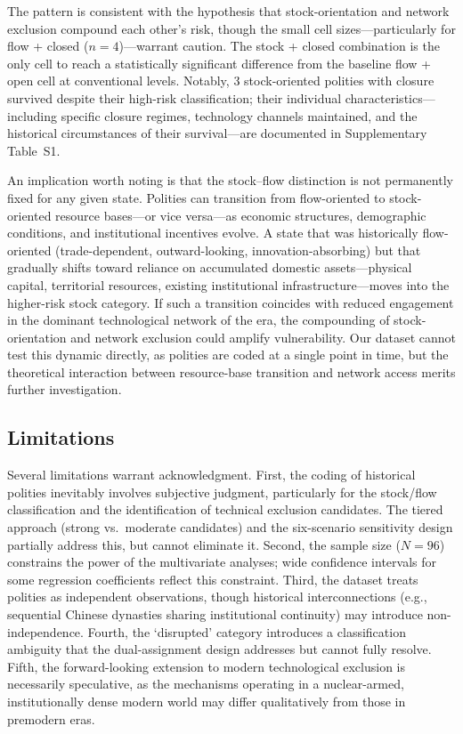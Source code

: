\documentclass[pdflatex,sn-basic]{sn-jnl}
\theoremstyle{thmstyleone}%
\theoremstyle{thmstyletwo}%
\theoremstyle{thmstylethree}%
\begin{document}
The pattern is consistent with the hypothesis that stock-orientation and network exclusion compound each other's risk, though the small cell sizes---particularly for flow + closed ($n = 4$)---warrant caution. The stock + closed combination is the only cell to reach a statistically significant difference from the baseline flow + open cell at conventional levels. Notably, 3 stock-oriented polities with closure survived despite their high-risk classification; their individual characteristics---including specific closure regimes, technology channels maintained, and the historical circumstances of their survival---are documented in Supplementary Table~S1.

An implication worth noting is that the stock--flow distinction is not permanently fixed for any given state. Polities can transition from flow-oriented to stock-oriented resource bases---or vice versa---as economic structures, demographic conditions, and institutional incentives evolve. A state that was historically flow-oriented (trade-dependent, outward-looking, innovation-absorbing) but that gradually shifts toward reliance on accumulated domestic assets---physical capital, territorial resources, existing institutional infrastructure---moves into the higher-risk stock category. If such a transition coincides with reduced engagement in the dominant technological network of the era, the compounding of stock-orientation and network exclusion could amplify vulnerability. Our dataset cannot test this dynamic directly, as polities are coded at a single point in time, but the theoretical interaction between resource-base transition and network access merits further investigation.

\subsection{Limitations}\label{sec:disc-limitations}

Several limitations warrant acknowledgment. First, the coding of historical polities inevitably involves subjective judgment, particularly for the stock/flow classification and the identification of technical exclusion candidates. The tiered approach (strong vs.\ moderate candidates) and the six-scenario sensitivity design partially address this, but cannot eliminate it. Second, the sample size ($N = 96$) constrains the power of the multivariate analyses; wide confidence intervals for some regression coefficients reflect this constraint. Third, the dataset treats polities as independent observations, though historical interconnections (e.g., sequential Chinese dynasties sharing institutional continuity) may introduce non-independence. Fourth, the `disrupted' category introduces a classification ambiguity that the dual-assignment design addresses but cannot fully resolve. Fifth, the forward-looking extension to modern technological exclusion is necessarily speculative, as the mechanisms operating in a nuclear-armed, institutionally dense modern world may differ qualitatively from those in premodern eras.
\end{document}

